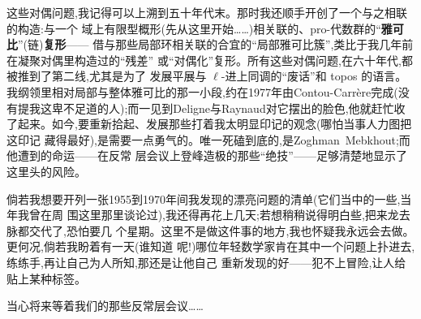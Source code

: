 这些对偶问题,我记得可以上溯到五十年代末。那时我还顺手开创了一个与之相联的构造:与一个
域上有限型概形(先从这里开始……)相关联的、pro-代数群的“\textbf{雅可比}”(链)\textbf{复形}——
借与那些局部环相关联的合宜的“局部雅可比簇”,类比于我几年前在凝聚对偶里构造过的“残差”
或“对偶化”复形。所有这些对偶问题,在六十年代,都被推到了第二线,尤其是为了
\dmark{}发展平展与 $\ell$-进上同调的“废话”和 topos 的语言。我纲领里相对局部与整体雅可比的那一小段,约在1977年由Contou-Carrère完成(没有提我这卑不足道的人);而一见到Deligne与Raynaud对它摆出的脸色,他就赶忙收了起来。如今,要重新拾起、发展那些打着我太明显印记的观念(哪怕当事人力图把这印记
藏得最好),是需要一点勇气的。唯一死磕到底的,是Zoghman~Mebkhout;而他遭到的命运——在反常
层会议上登峰造极的那些“绝技”——足够清楚地显示了这里头的风险。

倘若我想要开列一张1955到1970年间我发现的漂亮问题的清单(它们当中的一些,当年我曾在周
围这里那里谈论过),我还得再花上几天;若想稍稍说得明白些,把来龙去脉都交代了,恐怕要几
个星期。这里不是做这件事的地方,我也怀疑我永远会去做。更何况,倘若我盼着有一天(谁知道
呢!)哪位年轻数学家肯在其中一个问题上扑进去,练练手,再让自己为人所知,那还是让他自己
重新发现的好——犯不上冒险,让人给贴上某种标签。

当心将来等着我们的那些反常层会议……
